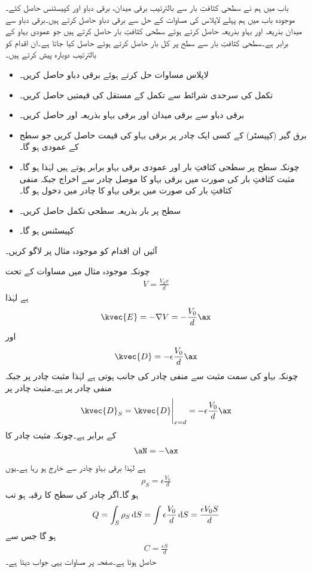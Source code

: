 باب  میں ہم نے سطحی کثافتِ بار سے بالترتیب برقی میدان، برقی دباو اور کپیسٹنس حاصل کئے۔موجودہ باب میں ہم پہلے لاپلاس کی مساوات کے حل سے برقی دباو حاصل کرتے ہیں۔برقی دباو سے میدان بذریعہ   اور بہاو بذریعہ  حاصل کرتے ہوئے سطحی کثافتِ بار حاصل کرتے ہیں جو عمودی بہاو کے برابر ہے۔سطحی کثافتِ بار سے سطح پر کل بار حاصل کرتے ہوئے  حاصل کیا جاتا ہے۔ان اقدام کو بالترتیب دوبارہ پیش کرتے ہیں۔
\begin{itemize}
\item
لاپلاس مساوات حل کرتے ہوئے برقی دباو  حاصل کریں۔
\item
تکمل کی سرحدی شرائط سے تکمل کے مستقل کی قیمتیں حاصل کریں۔
\item
برقی دباو سے برقی میدان اور برقی بہاو  بذریعہ  اور  حاصل کریں۔
\item
برق گیر (کپیسٹر)  کے کسی ایک چادر پر برقی بہاو کی قیمت  حاصل کریں جو سطح کے عمودی ہو گا۔ 
\item
چونکہ سطح پر سطحی کثافتِ بار اور عمودی برقی بہاو برابر ہوتے ہیں لہٰذا  ہو گا۔مثبت کثافتِ بار کی صورت میں برقی بہاو کا موصل چادر سے اخراج جبکہ منفی کثافتِ بار کی صورت میں برقی بہاو کا چادر میں دخول ہو گا۔
\item
سطح پر بار بذریعہ سطحی تکمل حاصل کریں۔
\item
کپیسٹنس  ہو گا۔
\end{itemize}
آئیں ان اقدام کو موجودہ مثال پر لاگو کریں۔

چونکہ موجودہ مثال میں مساوات  کے تحت
\begin{align*}
V=\frac{V_0x}{d}
\end{align*}
ہے لہٰذا
\begin{align*}
\kvec{E}=-\nabla V=-\frac{V_0}{d}\ax
\end{align*}
اور
\begin{align*}
\kvec{D}=-\epsilon \frac{V_0}{d}\ax
\end{align*}
چونکہ بہاو کی سمت مثبت سے منفی چادر کی جانب ہوتی ہے لہٰذا مثبت چادر  پر جبکہ منفی چادر  پر ہے۔مثبت چادر پر
\begin{align*}
\kvec{D}_S=\eval{\kvec{D}}_{x=d}=-\epsilon \frac{V_0}{d}\ax
\end{align*}
کے برابر ہے۔چونکہ مثبت چادر کا
\begin{align*}
\aN=-\ax
\end{align*}
ہے لہٰذا برقی بہاو چادر سے خارج ہو رہا ہے۔یوں
\begin{align*}
\rho_S=\epsilon \frac{V_0}{d}
\end{align*}
ہو گا۔اگر چادر کی سطح کا رقبہ  ہو تب
\begin{align*}
Q=\int_S \rho_S \dif S=\int \epsilon \frac{V_0}{d} \dif S=\frac{\epsilon V_0 S}{d}
\end{align*}
ہو گا جس سے
\begin{align*}
C=\frac{\epsilon S}{d}
\end{align*}
حاصل ہوتا ہے۔صفحہ  پر مساوات  یہی جواب دیتا ہے۔

